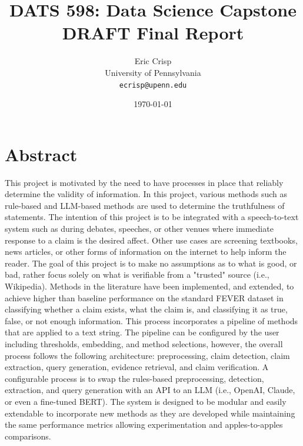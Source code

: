 \documentclass[11pt,letterpaper]{article}
\title{\Large \textbf{DATS 598: Data Science Capstone} \\ 
       \large \textbf{DRAFT} Final Report \\
       \vspace{0.5cm}
       \normalsize \textbf{\workingtitle}}
\author{Eric Crisp \\ 
        University of Pennsylvania \\
        \texttt{ecrisp@upenn.edu}}
\date{\today}
\newcommand{\createAbstract}[1]{
    \section*{Abstract}
    \addcontentsline{toc}{section}{Abstract}
    #1
}
\begin{document}
\maketitle
\tableofcontents
\newpage


\createAbstract{

    This project is motivated by the need to have processes in place that reliably determine the validity of information. In this project, various methods such as rule-based and LLM-based methods are used to determine the truthfulness of statements. The intention of this project is to be integrated with a speech-to-text system such as during debates, speeches, or other venues where immediate response to a claim is the desired affect. Other use cases are screening textbooks, news articles, or other forms of information on the internet to help inform the reader. The goal of this project is to make no assumptions as to what is good, or bad, rather focus solely on what is verifiable from a "trusted" source (i.e., Wikipedia). Methods in the literature have been implemented, and extended, to achieve higher than baseline performance on the standard FEVER dataset in classifying whether a claim exists, what the claim is, and classifying it as true, false, or not enough information. This process incorporates a pipeline of methods that are applied to a text string. The pipeline can be configured by the user including thresholds, embedding, and method selections, however, the overall process follows the following architecture: preprocessing, claim detection, claim extraction, query generation, evidence retrieval, and claim verification. A configurable process is to swap the rules-based preprocessing, detection, extraction, and query generation with an API to an LLM (i.e., OpenAI, Claude, or even a fine-tuned BERT). The system is designed to be modular and easily extendable to incorporate new methods as they are developed while maintaining the same performance metrics allowing experimentation and apples-to-apples comparisons.

}
\end{document}
